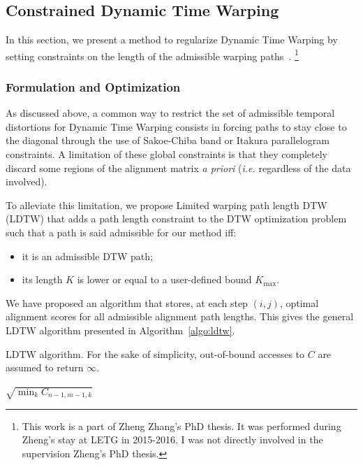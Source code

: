 \subsection{Constrained Dynamic Time Warping}

In this section, we present a method to regularize Dynamic Time Warping
by setting constraints on the length of the admissible warping
paths~\cite{zhang2017dynamic}.%
\footnote{This work is a part of Zheng Zhang's PhD thesis. It was performed
during Zheng's stay at LETG in 2015-2016.
I was not directly involved in the supervision Zheng's PhD thesis.}

\subsubsection{Formulation and Optimization}

As discussed above, a common way
to restrict the set of admissible temporal distortions for Dynamic Time Warping
consists in forcing paths to stay close to the diagonal through the use of
Sakoe-Chiba band or Itakura parallelogram constraints.
A limitation of these global constraints is that they completely
discard some regions of the alignment matrix \emph{a priori}
(\emph{i.e.} regardless of the data involved).

To alleviate this limitation, we propose Limited warping path length DTW (LDTW)
that adds a path length constraint to the DTW
optimization problem such that a path is said admissible for our method iff:

\begin{itemize}
\item it is an admissible DTW path;
\item its length $K$ is lower or equal to a user-defined bound $K_\text{max}$.
\end{itemize}

We have proposed an algorithm that stores, at each step $(i, j)$, optimal
alignment scores for all admissible alignment path lengths.
This gives the general LDTW algorithm presented in Algorithm~\ref{algo:ldtw}.

\begin{algorithm}[t]
 \caption{LDTW algorithm. For the sake of simplicity, out-of-bound accesses to $C$ are assumed to return $\infty$.}
 \label{algo:ldtw}
  \Return $\sqrt{\min_{k} C_{n - 1, m - 1, k}}$
\end{algorithm}


